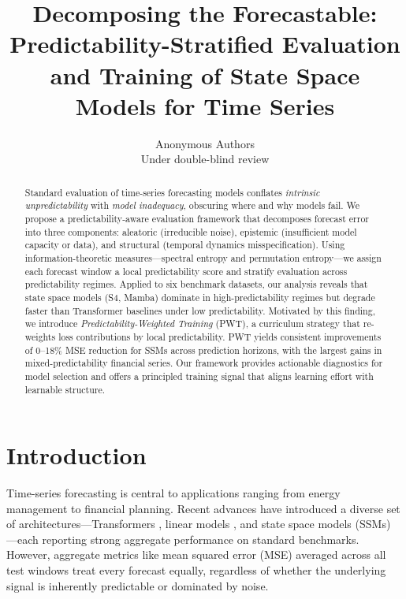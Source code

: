 \documentclass[10pt]{article}
\title{Decomposing the Forecastable: Predictability-Stratified Evaluation \\and Training of State Space Models for Time Series}
\author{\name Anonymous Authors \\
      \addr Under double-blind review}
\newcommand{\pwt}{\textsc{PWT}}
\begin{document}
\maketitle

\begin{abstract}
Standard evaluation of time-series forecasting models conflates \emph{intrinsic unpredictability} with \emph{model inadequacy}, obscuring where and why models fail. We propose a predictability-aware evaluation framework that decomposes forecast error into three components: aleatoric (irreducible noise), epistemic (insufficient model capacity or data), and structural (temporal dynamics misspecification). Using information-theoretic measures---spectral entropy and permutation entropy---we assign each forecast window a local predictability score and stratify evaluation across predictability regimes. Applied to six benchmark datasets, our analysis reveals that state space models (S4, Mamba) dominate in high-predictability regimes but degrade faster than Transformer baselines under low predictability. Motivated by this finding, we introduce \emph{Predictability-Weighted Training} (\pwt{}), a curriculum strategy that re-weights loss contributions by local predictability. \pwt{} yields consistent improvements of 0--18\% MSE reduction for SSMs across prediction horizons, with the largest gains in mixed-predictability financial series. Our framework provides actionable diagnostics for model selection and offers a principled training signal that aligns learning effort with learnable structure.
\end{abstract}

\section{Introduction}
\label{sec:intro}

Time-series forecasting is central to applications ranging from energy management \citep{zhou2021informer} to financial planning. Recent advances have introduced a diverse set of architectures---Transformers \citep{nie2023patchtst, liu2024itransformer}, linear models \citep{zeng2023transformers}, and state space models (SSMs) \citep{gu2022efficiently, gu2023mamba}---each reporting strong aggregate performance on standard benchmarks. However, aggregate metrics like mean squared error (MSE) averaged across all test windows treat every forecast equally, regardless of whether the underlying signal is inherently predictable or dominated by noise.
\end{document}
